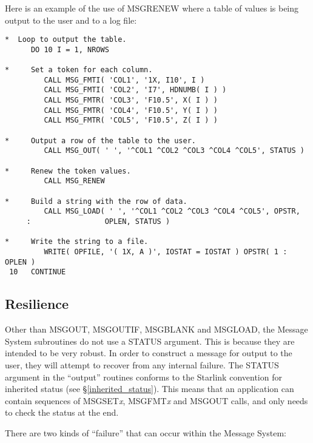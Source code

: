 \documentclass[twoside,11pt]{article}
\newcommand{\htmlref}[2]{#1}
\newcommand{\latex}[1]{#1}
\newcommand{\xlabel}[1]{}
\renewcommand{\_}{\texttt{\symbol{95}}}
\begin{document}
Here is an example of the use of MSG\_RENEW where a table of values is being
output to the user and to a log file:

\begin {small}
\begin{verbatim}
*  Loop to output the table.
      DO 10 I = 1, NROWS

*     Set a token for each column.
         CALL MSG_FMTI( 'COL1', '1X, I10', I )
         CALL MSG_FMTI( 'COL2', 'I7', HDNUMB( I ) )
         CALL MSG_FMTR( 'COL3', 'F10.5', X( I ) )
         CALL MSG_FMTR( 'COL4', 'F10.5', Y( I ) )
         CALL MSG_FMTR( 'COL5', 'F10.5', Z( I ) )

*     Output a row of the table to the user.
         CALL MSG_OUT( ' ', '^COL1 ^COL2 ^COL3 ^COL4 ^COL5', STATUS )

*     Renew the token values.
         CALL MSG_RENEW

*     Build a string with the row of data.
         CALL MSG_LOAD( ' ', '^COL1 ^COL2 ^COL3 ^COL4 ^COL5', OPSTR,
     :                 OPLEN, STATUS )

*     Write the string to a file.
         WRITE( OPFILE, '( 1X, A )', IOSTAT = IOSTAT ) OPSTR( 1 : OPLEN )
 10   CONTINUE
\end{verbatim}
\end {small}


\subsection{\xlabel{resilience}Resilience}

Other than MSG\_OUT, MSG\_OUTIF, MSG\_BLANK and MSG\_LOAD, the Message System 
subroutines do not use a STATUS argument. 
This is because they are intended to be very robust.
In order to construct a message for output to the user, they will attempt to 
recover from any internal failure. 
The STATUS argument in the ``output'' routines conforms to the Starlink
convention for 
\htmlref
{inherited status}{inherited_status}\latex{ (see \S\ref{inherited_status})}.
This means that an application can contain sequences of MSG\_SET\textit{x}, 
MSG\_FMT\textit{x} and MSG\_OUT calls, and only needs to check the status at the 
end.

There are two kinds of ``failure'' that can occur within the Message
System:
\end{document}
